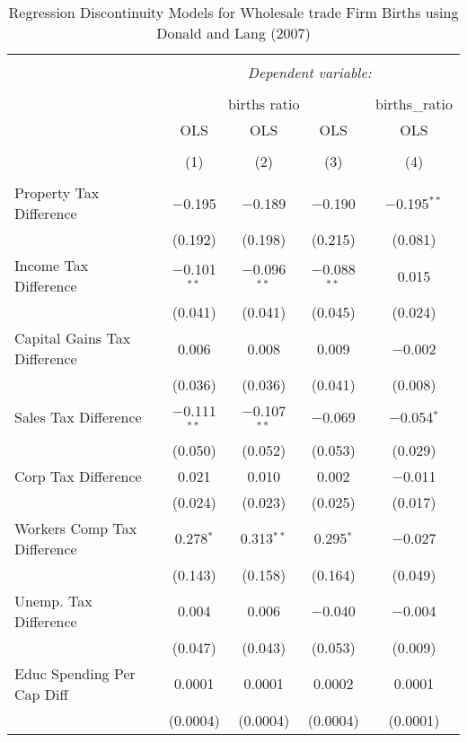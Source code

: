 
\begin{table}[!htbp] \centering 
  \caption{Regression Discontinuity Models for  Wholesale trade Firm Births using Donald and Lang (2007)} 
  \label{} 
\begin{tabular}{@{\extracolsep{5pt}}lcccc} 
\\[-1.8ex]\hline 
\hline \\[-1.8ex] 
 & \multicolumn{4}{c}{\textit{Dependent variable:}} \\ 
\cline{2-5} 
\\[-1.8ex] & \multicolumn{3}{c}{births ratio} & births\_ratio \\ 
 & OLS & OLS & OLS & OLS \\ 
\\[-1.8ex] & (1) & (2) & (3) & (4)\\ 
\hline \\[-1.8ex] 
 Property Tax Difference & $-$0.195 & $-$0.189 & $-$0.190 & $-$0.195$^{**}$ \\ 
  & (0.192) & (0.198) & (0.215) & (0.081) \\ 
  Income Tax Difference & $-$0.101$^{**}$ & $-$0.096$^{**}$ & $-$0.088$^{**}$ & 0.015 \\ 
  & (0.041) & (0.041) & (0.045) & (0.024) \\ 
  Capital Gains Tax Difference & 0.006 & 0.008 & 0.009 & $-$0.002 \\ 
  & (0.036) & (0.036) & (0.041) & (0.008) \\ 
  Sales Tax Difference & $-$0.111$^{**}$ & $-$0.107$^{**}$ & $-$0.069 & $-$0.054$^{*}$ \\ 
  & (0.050) & (0.052) & (0.053) & (0.029) \\ 
  Corp Tax Difference & 0.021 & 0.010 & 0.002 & $-$0.011 \\ 
  & (0.024) & (0.023) & (0.025) & (0.017) \\ 
  Workers Comp Tax Difference & 0.278$^{*}$ & 0.313$^{**}$ & 0.295$^{*}$ & $-$0.027 \\ 
  & (0.143) & (0.158) & (0.164) & (0.049) \\ 
  Unemp. Tax Difference & 0.004 & 0.006 & $-$0.040 & $-$0.004 \\ 
  & (0.047) & (0.043) & (0.053) & (0.009) \\ 
  Educ Spending Per Cap Diff & 0.0001 & 0.0001 & 0.0002 & 0.0001 \\ 
  & (0.0004) & (0.0004) & (0.0004) & (0.0001) \\ 

\end{tabular}
\end{table}
